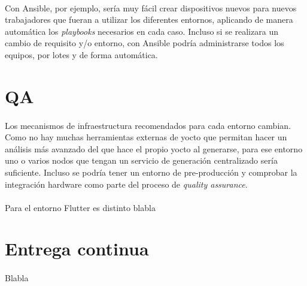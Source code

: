 \paragraph{}Con Ansible, por ejemplo, sería muy fácil crear dispositivos nuevos para
nuevos trabajadores que fueran a utilizar los diferentes entornos, aplicando de manera
automática los \emph{playbooks} necesarios en cada caso. Incluso si se realizara un
cambio de requisito y/o entorno, con Ansible podría administrarse todos los equipos,
por lotes y de forma automática.

\section{QA}

\paragraph{}Los mecanismos de infraestructura recomendados para cada entorno cambian.
Como no hay muchas herramientas externas de yocto que permitan hacer un análisis más
avanzado del que hace el propio yocto al generarse, para ese entorno uno o varios nodos
que tengan un servicio de generación centralizado sería suficiente. Incluso se podría
tener un entorno de pre-producción y comprobar la integración hardware como parte del
proceso de \emph{quality assurance}.

\paragraph{}Para el entorno Flutter es distinto blabla


\section{Entrega continua}

\paragraph{}Blabla

